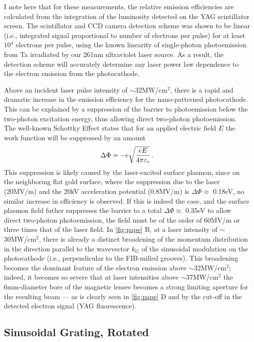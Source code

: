 I note here that for these measurements, the relative emission efficiencies are calculated from the integration of the luminosity detected on the YAG scintillator screen.
The scintillator and CCD camera detection scheme was shown to be linear (i.e., integrated signal proportional to number of electrons per pulse) for at least $10^4$ electrons per pulse, using the known linearity of single-photon photoemission from Ta irradiated by our 261nm ultraviolet laser source.
As a result, the detection scheme will accurately determine any laser power law dependence to the electron emission from the photocathode.

Above an incident laser pulse intensity of $\sim$32MW/cm$^2$, there is a rapid and dramatic increase in the emission efficiency for the nano-patterned photocathode.
This can be explained by a suppression of the barrier to photoemission below the two-photon excitation energy, thus allowing direct two-photon photoemission.
The well-known Schottky Effect states that for an applied electric field $E$ the work function will be suppressed by an amount
\begin{equation}
  \Delta \Phi = - e\sqrt{\frac{e E}{4 \pi \varepsilon_{{\scriptscriptstyle 0}}}} \,\text{.}
\end{equation}
This suppression is likely caused by the laser-excited surface plasmon, since on the neighboring flat gold surface, where the suppression due to the laser (20MV/m) and the 20kV acceleration potential (0.8MV/m) is $\Delta \Phi \approx $ 0.18eV, no similar increase in efficiency is observed.
If this is indeed the case, and the surface plasmon field futher suppresses the barrier to a total $ \Delta \Phi \approx $ 0.35eV to allow direct two-photon photoemission, the field must be of the order of 60MV/m or three times that of the laser field.
In \ref{fig:pape} B, at a laser intensity of $\sim$30MW/cm$^2$, there is already a distinct broadening of the momentum distribution in the direction parallel to the wavevector $k_G$ of the sinusoidal modulation on the photocathode (i.e., perpendicular to the FIB-milled grooves). 
This broadening becomes the dominant feature of the electron emission above $\sim$32MW/cm$^2$; indeed, it becomes so severe that at laser intensities above $\sim$37MW/cm$^2$ the 6mm-diameter bore of the magnetic lenses becomes a strong limiting aperture for the resulting beam --- as is clearly seen in \ref{fig:pape} D and by the cut-off in the detected electron signal (YAG fluorescence).

\subsection{Sinusoidal Grating, Rotated}

